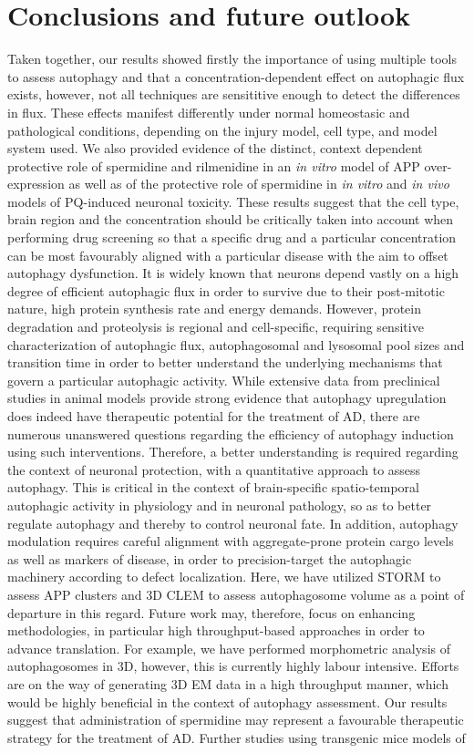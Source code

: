 \section{Conclusions and future outlook}
Taken together, our results showed firstly the importance of using multiple tools to assess autophagy and that a concentration-dependent effect on autophagic flux exists, however, not all techniques are sensititive enough to detect the differences in flux. These effects manifest differently under normal homeostasic and pathological conditions, depending on the injury model, cell type, and model system used. We also provided evidence of the distinct, context dependent protective role of spermidine and rilmenidine in an \textit{in vitro} model of APP over-expression as well as of the protective role of spermidine in \textit{in vitro} and \textit{in vivo} models of PQ-induced neuronal toxicity. These results suggest that the cell type, brain region and the concentration should be critically taken into account when performing drug screening so that a specific drug and a particular concentration can be most favourably aligned with a particular disease with the aim to offset autophagy dysfunction. It is widely known that neurons depend vastly on a high degree of efficient autophagic flux in order to survive due to their post-mitotic nature, high protein synthesis rate and energy demands. However, protein degradation and proteolysis is regional and cell-specific, requiring sensitive characterization of autophagic flux, autophagosomal and lysosomal pool sizes and transition time  in order to better understand the underlying mechanisms that govern a particular autophagic activity. While extensive data from preclinical studies in animal models provide strong evidence that autophagy upregulation does indeed have therapeutic potential for the treatment of AD, there are numerous unanswered questions regarding the efficiency of autophagy induction using such interventions. Therefore, a better understanding is required regarding the context of neuronal protection, with a quantitative approach to assess autophagy. This is critical in the context of brain-specific spatio-temporal autophagic activity in physiology and in neuronal pathology, so as to better regulate autophagy and thereby to control neuronal fate. In addition, autophagy modulation requires careful alignment with aggregate-prone protein cargo levels as well as markers of disease, in order to precision-target the autophagic machinery according to defect localization. Here, we have utilized STORM to assess APP clusters and 3D CLEM to assess autophagosome volume as a point of departure in this regard. Future work may, therefore, focus on enhancing methodologies, in particular high throughput-based approaches in order to advance translation. For example, we have performed morphometric analysis of autophagosomes in 3D, however, this is currently highly labour intensive. Efforts are on the way of generating 3D EM data in a high throughput manner, which would be highly beneficial in the context of autophagy assessment. Our results suggest that administration of spermidine may represent a favourable therapeutic strategy for the treatment of AD. Further studies using transgenic mice models of 